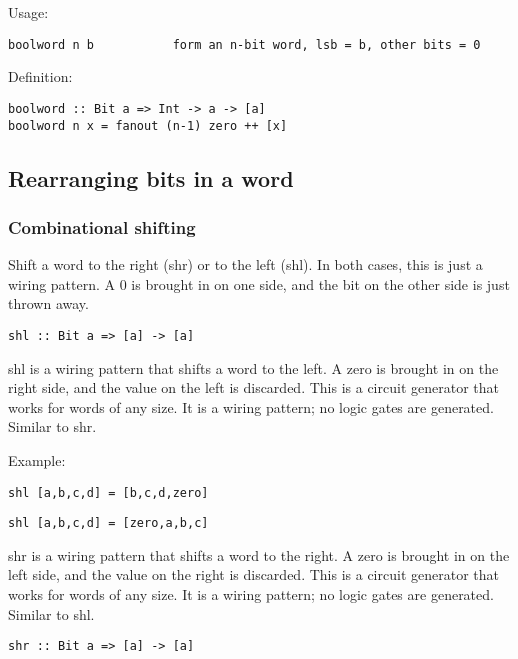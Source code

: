 \documentclass[11pt]{article}
\begin{document}
Usage:

\begin{verbatim}
boolword n b           form an n-bit word, lsb = b, other bits = 0
\end{verbatim}

Definition:

\begin{verbatim}
boolword :: Bit a => Int -> a -> [a]
boolword n x = fanout (n-1) zero ++ [x]
\end{verbatim}

\subsection{Rearranging bits in a word}
\label{sec:orgb77088c}

\subsubsection{Combinational shifting}
\label{sec:org26799fd}

Shift a word to the right (shr) or to the left (shl).  In both cases,
this is just a wiring pattern.  A 0 is brought in on one side, and the
bit on the other side is just thrown away.



\begin{verbatim}
shl :: Bit a => [a] -> [a]
\end{verbatim}


shl is a wiring pattern that shifts a word to the left.  A zero is
brought in on the right side, and the value on the left is discarded.
This is a circuit generator that works for words of any size.  It is a
wiring pattern; no logic gates are generated.  Similar to shr.

Example:


\begin{verbatim}
shl [a,b,c,d] = [b,c,d,zero]
\end{verbatim}


\begin{verbatim}
shl [a,b,c,d] = [zero,a,b,c]
\end{verbatim}


shr is a wiring pattern that shifts a word to the right.  A zero is
brought in on the left side, and the value on the right is discarded.
This is a circuit generator that works for words of any size.  It is a
wiring pattern; no logic gates are generated.  Similar to shl.


\begin{verbatim}
shr :: Bit a => [a] -> [a]
\end{verbatim}
\end{document}
